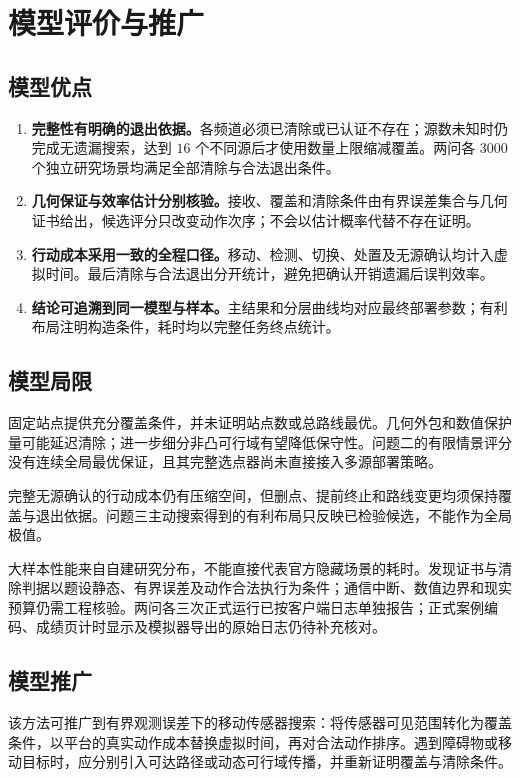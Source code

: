 \section{模型评价与推广}
\subsection{模型优点}
\begin{enumerate}
\item \textbf{完整性有明确的退出依据。}各频道必须已清除或已认证不存在；源数未知时仍完成无遗漏搜索，达到 $16$ 个不同源后才使用数量上限缩减覆盖。两问各 $3000$ 个独立研究场景均满足全部清除与合法退出条件。
\item \textbf{几何保证与效率估计分别核验。}接收、覆盖和清除条件由有界误差集合与几何证书给出，候选评分只改变动作次序；不会以估计概率代替不存在证明。
\item \textbf{行动成本采用一致的全程口径。}移动、检测、切换、处置及无源确认均计入虚拟时间。最后清除与合法退出分开统计，避免把确认开销遗漏后误判效率。
\item \textbf{结论可追溯到同一模型与样本。}主结果和分层曲线均对应最终部署参数；有利布局注明构造条件，耗时均以完整任务终点统计。
\end{enumerate}

\subsection{模型局限}
固定站点提供充分覆盖条件，并未证明站点数或总路线最优。几何外包和数值保护量可能延迟清除；进一步细分非凸可行域有望降低保守性。问题二的有限情景评分没有连续全局最优保证，且其完整选点器尚未直接接入多源部署策略。

完整无源确认的行动成本仍有压缩空间，但删点、提前终止和路线变更均须保持覆盖与退出依据。问题三主动搜索得到的有利布局只反映已检验候选，不能作为全局极值。

大样本性能来自自建研究分布，不能直接代表官方隐藏场景的耗时。发现证书与清除判据以题设静态、有界误差及动作合法执行为条件；通信中断、数值边界和现实预算仍需工程核验。两问各三次正式运行已按客户端日志单独报告；正式案例编码、成绩页计时显示及模拟器导出的原始日志仍待补充核对。

\subsection{模型推广}
该方法可推广到有界观测误差下的移动传感器搜索：将传感器可见范围转化为覆盖条件，以平台的真实动作成本替换虚拟时间，再对合法动作排序。遇到障碍物或移动目标时，应分别引入可达路径或动态可行域传播，并重新证明覆盖与清除条件。

